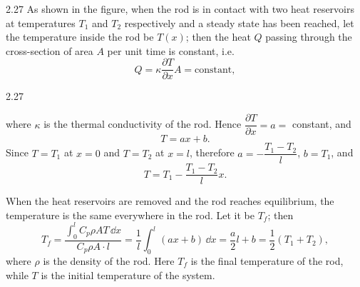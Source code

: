 \begin{solution}{2.27}
As shown in the figure, when the rod is in contact with two heat reservoirs at temperatures $T_1$
and $T_2$ respectively and a steady state has been reached, let the temperature inside the rod be
$T(x)$; then the heat $Q$ passing through the cross-section of area $A$ per unit time is
constant, i.e.
\begin{equation*}
Q = \kappa\frac{\partial T}{\partial x}A = \text{constant},
\end{equation*}

\begin{figbox}{2.27}
\end{figbox}
where $\kappa$ is the thermal conductivity of the rod. Hence $\dfrac{\partial T}{\partial x}=a=$
constant, and
\begin{equation*}
T = ax+b .
\end{equation*}
Since $T=T_1$ at $x=0$ and $T=T_2$ at $x=l$, therefore
$a=-\dfrac{T_1-T_2}{l}$, $b=T_1$, and
\begin{equation*}
T = T_1-\frac{T_1-T_2}{l}x .
\end{equation*}

When the heat reservoirs are removed and the rod reaches equilibrium, the temperature is the same
everywhere in the rod. Let it be $T_f$; then
\begin{equation*}
T_f = \frac{\displaystyle\int_0^l C_p\rho AT\,\dd x}{C_p\rho A\cdot l}
= \frac{1}{l}\int_0^l(ax+b)\,\dd x = \frac{a}{2}l+b = \frac{1}{2}\left(T_1+T_2\right),
\end{equation*}
where $\rho$ is the density of the rod. Here $T_f$ is the final temperature of the rod, while $T$
is the initial temperature of the system.


\end{solution}
